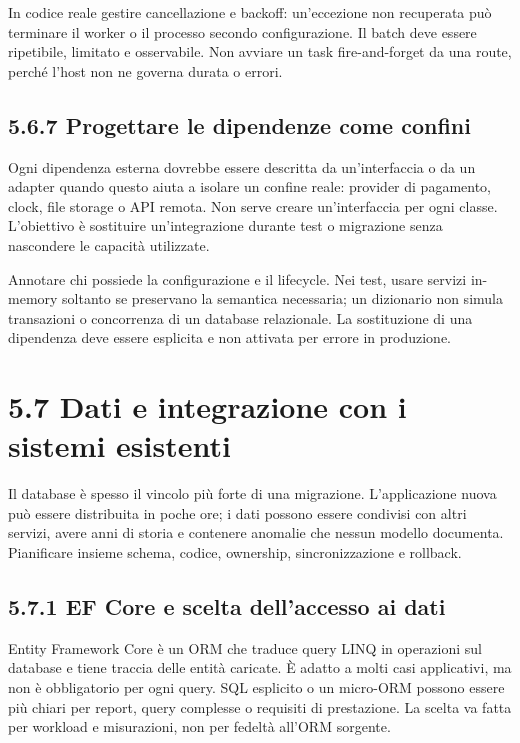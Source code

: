 \documentclass[
  italian,
  10pt,
]{book}
\begin{document}
In codice reale gestire cancellazione e backoff: un'eccezione non
recuperata può terminare il worker o il processo secondo configurazione.
Il batch deve essere ripetibile, limitato e osservabile. Non avviare un
task fire-and-forget da una route, perché l'host non ne governa durata o
errori.

\subsection{5.6.7 Progettare le dipendenze come
confini}\label{progettare-le-dipendenze-come-confini}

Ogni dipendenza esterna dovrebbe essere descritta da un'interfaccia o da
un adapter quando questo aiuta a isolare un confine reale: provider di
pagamento, clock, file storage o API remota. Non serve creare
un'interfaccia per ogni classe. L'obiettivo è sostituire un'integrazione
durante test o migrazione senza nascondere le capacità utilizzate.

Annotare chi possiede la configurazione e il lifecycle. Nei test, usare
servizi in-memory soltanto se preservano la semantica necessaria; un
dizionario non simula transazioni o concorrenza di un database
relazionale. La sostituzione di una dipendenza deve essere esplicita e
non attivata per errore in produzione.

\section{5.7 Dati e integrazione con i sistemi
esistenti}\label{dati-e-integrazione-con-i-sistemi-esistenti}

Il database è spesso il vincolo più forte di una migrazione.
L'applicazione nuova può essere distribuita in poche ore; i dati possono
essere condivisi con altri servizi, avere anni di storia e contenere
anomalie che nessun modello documenta. Pianificare insieme schema,
codice, ownership, sincronizzazione e rollback.

\subsection{5.7.1 EF Core e scelta dell'accesso ai
dati}\label{ef-core-e-scelta-dellaccesso-ai-dati}

Entity Framework Core è un ORM che traduce query LINQ in operazioni sul
database e tiene traccia delle entità caricate. È adatto a molti casi
applicativi, ma non è obbligatorio per ogni query. SQL esplicito o un
micro-ORM possono essere più chiari per report, query complesse o
requisiti di prestazione. La scelta va fatta per workload e misurazioni,
non per fedeltà all'ORM sorgente.
\end{document}
